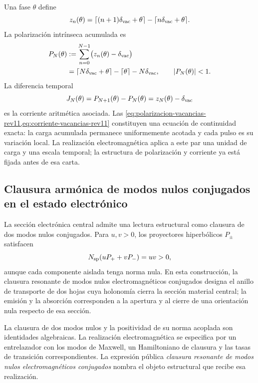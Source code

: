 Una fase \(\theta\) define
\[
 z_n(\theta)=\lceil(n+1)\delta_{\rm vac}+\theta\rceil
 -\lceil n\delta_{\rm vac}+\theta\rceil.
\]
La polarización intrínseca acumulada es
\begin{equation}
 \begin{aligned}
 P_N(\theta)
 &:=\sum_{n=0}^{N-1}\bigl(z_n(\theta)-\delta_{\rm vac}\bigr)\\
 &=\lceil N\delta_{\rm vac}+\theta\rceil-
   \lceil\theta\rceil-N\delta_{\rm vac},
 \qquad |P_N(\theta)|<1.
 \end{aligned}
 \label{eq:polarizacion-vacancias-rev11}
\end{equation}
La diferencia temporal
\begin{equation}
 J_N(\theta)=P_{N+1}(\theta)-P_N(\theta)
 =z_N(\theta)-\delta_{\rm vac}
 \label{eq:corriente-vacancias-rev11}
\end{equation}
es la corriente aritmética asociada. Las
\cref{eq:polarizacion-vacancias-rev11,eq:corriente-vacancias-rev11}
constituyen una ecuación de continuidad exacta: la carga acumulada permanece
uniformemente acotada y cada pulso es su variación local. La realización
electromagnética aplica a este par una unidad de carga y una escala temporal;
la estructura de polarización y corriente ya está fijada antes de esa carta.

\subsection{Clausura armónica de modos nulos conjugados en el estado electrónico}
\label{sec:nido-armonico-modos-nulos-rev11}

La sección electrónica central admite una lectura estructural como clausura
de dos modos nulos conjugados. Para \(u,v>0\), los proyectores hiperbólicos
\(P_\pm\) satisfacen
\[
 N_{\rm sp}(uP_++vP_-)=uv>0,
\]
aunque cada componente aislada tenga norma nula. En esta construcción, la
clausura resonante de modos nulos electromagnéticos conjugados designa el
anillo de transporte de dos hojas cuya holonomía cierra la sección material
central; la emisión y la absorción corresponden a la apertura y al cierre de
una orientación nula respecto de esa sección.

\begin{statusbox}[title={Realización fotónica de la clausura armónica}]
La clausura de dos modos nulos y la positividad de su norma acoplada son
identidades algebraicas. La realización electromagnética se especifica por
un entrelazador con los modos de Maxwell, un Hamiltoniano de clausura y las
tasas de transición correspondientes. La expresión pública
\emph{clausura resonante de modos nulos electromagnéticos conjugados}
nombra el objeto estructural que recibe esa realización.
\end{statusbox}
